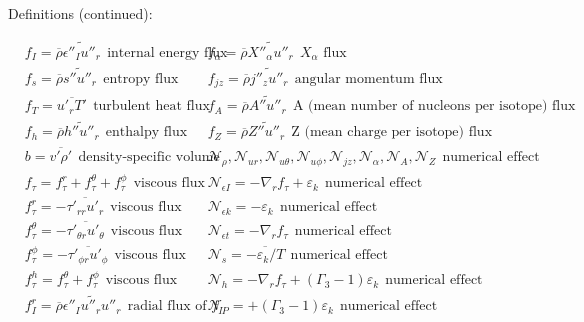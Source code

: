 \documentclass[10pt,paper=a4]{report}
\newcommand{\eht}{\overline}
\newcommand{\fht}{\widetilde}
\begin{document}
\newpage

\begin{table*}
\label{tab:rans-cont}
\caption{Definitions (continued):}
\begin{align}
& f_I = \eht{\rho} \fht{\epsilon''_I u''_r} \ \ \mbox{internal energy flux}        & & f_\alpha = \eht{\rho} \fht{X''_\alpha u''_r} \ \ \mbox{$X_\alpha$ flux}                   \nonumber \\        
& f_s = \eht{\rho} \fht{s'' u''_r} \ \ \mbox{entropy flux}                & & f_{jz} = \eht{\rho}\fht{j''_z u''_r} \ \ \mbox{angular momentum flux}    \nonumber \\ 
& f_T = \eht{u'_r T'} \ \ \mbox{turbulent heat flux}                      & & f_A = \eht{\rho}\fht{A''u''_r} \ \ \mbox{A (mean number of nucleons per isotope) flux}  \nonumber \\
& f_h = \eht{\rho}\fht{h''u''_r} \ \ \mbox{enthalpy flux}        & &  f_Z = \eht{\rho}\fht{Z''u''_r} \ \ \mbox{Z (mean charge per isotope) flux}  \nonumber \\         
& b = \overline{v'\rho'} \ \ \mbox{density-specific volume covariance}                & & \mathcal N_\rho, \mathcal N_{ur}, \mathcal N_{u\theta}, \mathcal N_{u\phi}, \mathcal N_{jz}, \mathcal N_{\alpha}, \mathcal N_{A}, \mathcal N_{Z} \ \ \mbox{numerical effect} \nonumber \\              
& f_\tau = f_\tau^r + f_\tau^\theta + f_\tau^\phi \ \ \mbox{viscous flux}                    & &  \mathcal N_{\epsilon I} = -\nabla_r f_\tau +\varepsilon_k \ \ \mbox{numerical effect} \nonumber \\ 
& f_\tau^r = -\eht{\tau'_{rr}u'_r}  \ \ \mbox{viscous flux}                               & &  \mathcal N_{\epsilon k} = -\varepsilon_k \ \ \mbox{numerical effect} \nonumber \\              
& f_\tau^\theta = -\eht{\tau'_{\theta r} u'_\theta }  \ \ \mbox{viscous flux}                 & &  \mathcal N_{\epsilon t} = -\nabla_r f_\tau \ \ \mbox{numerical effect} \nonumber \\  
& f_\tau^\phi = -\eht{\tau'_{\phi r} u'_\phi}  \ \ \mbox{viscous flux}                       & &   \mathcal N_{s} = \eht{-\varepsilon_k/T} \ \ \mbox{numerical effect} \nonumber \\          
& f_\tau^h = f_\tau^\theta + f_\tau^\phi   \ \ \mbox{viscous flux}                           & & \mathcal N_{h} = -\nabla_r f_\tau + (\Gamma_3 -1)\varepsilon_k \ \ \mbox{numerical effect} \nonumber \\              
& f_I^r = \eht{\rho}\fht{\epsilon''_I u''_r u''_r} \ \ \mbox{radial flux of $f_I$}      & &  \mathcal N_{P} = +(\Gamma_3 -1)\varepsilon_k \ \ \mbox{numerical effect} \nonumber \\

\end{align}
\end{table*}
\end{document}
